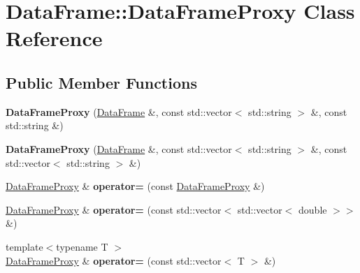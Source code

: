 \hypertarget{classDataFrame_1_1DataFrameProxy}{}\section{Data\+Frame\+:\+:Data\+Frame\+Proxy Class Reference}
\label{classDataFrame_1_1DataFrameProxy}
\subsection*{Public Member Functions}
\begin{DoxyCompactItemize}
\item 
\mbox{\label{classDataFrame_1_1DataFrameProxy_a8146ed01a9c802591fe8aa1cca40da92}} 
{\bfseries Data\+Frame\+Proxy} (\hyperlink{classDataFrame}{Data\+Frame} \&, const std\+::vector$<$ std\+::string $>$ \&, const std\+::string \&)
\item 
\mbox{\label{classDataFrame_1_1DataFrameProxy_aea502f05eaf39709839140db0ae104f1}} 
{\bfseries Data\+Frame\+Proxy} (\hyperlink{classDataFrame}{Data\+Frame} \&, const std\+::vector$<$ std\+::string $>$ \&, const std\+::vector$<$ std\+::string $>$ \&)
\item 
\mbox{\label{classDataFrame_1_1DataFrameProxy_a6d56fc9161384065db7812e513313731}} 
\hyperlink{classDataFrame_1_1DataFrameProxy}{Data\+Frame\+Proxy} \& {\bfseries operator=} (const \hyperlink{classDataFrame_1_1DataFrameProxy}{Data\+Frame\+Proxy} \&)
\item 
\mbox{\label{classDataFrame_1_1DataFrameProxy_ae6c8c653d011966f9bf91396123bb0a5}} 
\hyperlink{classDataFrame_1_1DataFrameProxy}{Data\+Frame\+Proxy} \& {\bfseries operator=} (const std\+::vector$<$ std\+::vector$<$ double $>$$>$ \&)
\item 
\mbox{\label{classDataFrame_1_1DataFrameProxy_a25774e44f4e4d36e5b640e7387d24361}} 
{\footnotesize template$<$typename T $>$ }\\\hyperlink{classDataFrame_1_1DataFrameProxy}{Data\+Frame\+Proxy} \& {\bfseries operator=} (const std\+::vector$<$ T $>$ \&)
\item 
\mbox{\label{classDataFrame_1_1DataFrameProxy_a74080fd3f0407cefdb332062ca91ecc9}} 
$$
\end{DoxyCompactItemize}
